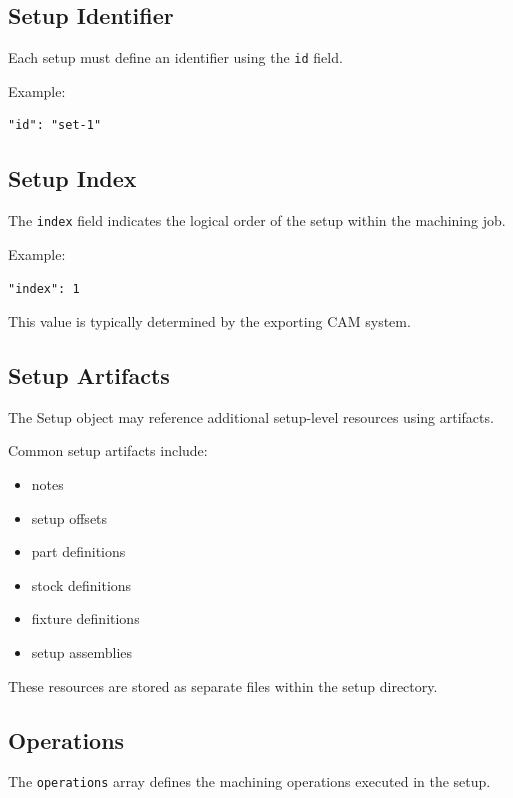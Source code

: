 \subsection{Setup Identifier}

Each setup must define an identifier using the \texttt{id} field.

Example:

\begin{verbatim}
"id": "set-1"
\end{verbatim}

\subsection{Setup Index}

The \texttt{index} field indicates the logical order of the setup within the machining job.

Example:

\begin{verbatim}
"index": 1
\end{verbatim}

This value is typically determined by the exporting CAM system.

\subsection{Setup Artifacts}

The Setup object may reference additional setup-level resources using artifacts.

Common setup artifacts include:

\begin{itemize}
\item notes
\item setup offsets
\item part definitions
\item stock definitions
\item fixture definitions
\item setup assemblies
\end{itemize}

These resources are stored as separate files within the setup directory.

\subsection{Operations}

The \texttt{operations} array defines the machining operations executed in the setup.

